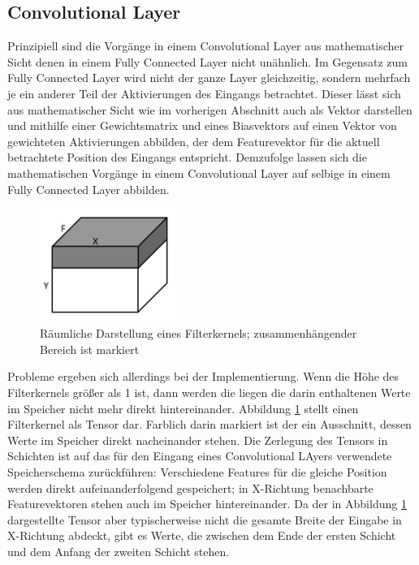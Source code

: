 \documentclass[../main.tex]{subfiles}
\begin{document}
\subsection{Convolutional Layer}
Prinzipiell sind die Vorgänge in einem Convolutional Layer aus mathematischer Sicht denen in einem Fully Connected Layer nicht unähnlich. Im Gegensatz zum Fully Connected Layer wird nicht der ganze Layer gleichzeitig, sondern mehrfach je ein anderer Teil der Aktivierungen des Eingangs betrachtet. Dieser lässt sich aus mathematischer Sicht wie im vorherigen Abschnitt auch als Vektor darstellen und mithilfe einer Gewichtsmatrix und eines Biasvektors auf einen Vektor von gewichteten Aktivierungen abbilden, der dem Featurevektor für die aktuell betrachtete Position des Eingangs entspricht. Demzufolge lassen sich die mathematischen Vorgänge in einem Convolutional Layer auf selbige in einem Fully Connected Layer abbilden. 
\begin{figure}
	\centering 
	\includegraphics[width=0.4\textwidth]{../images/Schmidt/convTensor.jpg} 
	\caption {Räumliche Darstellung eines Filterkernels; zusammenhängender Bereich ist markiert}
	\label{pic:conv_tensor} 
\end{figure} 
Probleme ergeben sich allerdings bei der Implementierung. Wenn die Höhe des Filterkernels größer als 1 ist, dann werden die liegen die darin enthaltenen Werte im Speicher nicht mehr direkt hintereinander. Abbildung \ref{pic:conv_tensor} stellt einen Filterkernel als Tensor dar. Farblich darin markiert ist der ein Ausschnitt, dessen Werte im Speicher direkt nacheinander stehen. Die Zerlegung des Tensors in Schichten ist auf das für den Eingang eines Convolutional LAyers verwendete Speicherschema zurückführen: Verschiedene Features für die gleiche Position werden direkt aufeinanderfolgend gespeichert; in X-Richtung benachbarte Featurevektoren stehen auch im Speicher hintereinander. Da der in Abbildung \ref{pic:conv_tensor} dargestellte Tensor aber typischerweise nicht die gesamte Breite der Eingabe in X-Richtung abdeckt, gibt es Werte, die zwischen dem Ende der ersten Schicht und dem Anfang der zweiten Schicht stehen. 
\end{document}
